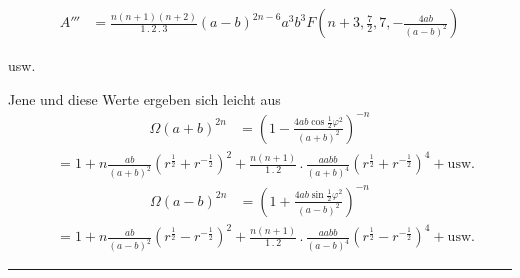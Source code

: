 \[
\begin{array}{rl}
A'''&=\frac{n(n+1)(n+2)}{1\mathbin{.}2\mathbin{.}3}(a-b)^{2n-6}a^3b^3F(n+3,\frac72,7,-\frac{4ab}{(a-b)^2})
\end{array}
\]
\begin{center}usw.\end{center}
Jene und diese Werte ergeben sich leicht aus
\[
\begin{array}{rl}
\Omega(a+b)^{2n}&=(1-\frac{4ab\cos\frac12\varphi^2}{(a+b)^2})^{-n}
\end{array}
\]
\[
\begin{array}{rl}
&=1+n\frac{ab}{(a+b)^2}(r^{\frac12}+r^{-\frac12})^2+\frac{n(n+1)}{1\mathbin{.}2}\mathbin{.}\frac{aabb}{(a+b)^4}(r^{\frac12}+r^{-\frac12})^4+\mathrm{usw.}
\end{array}
\]
\[
\begin{array}{rl}
\Omega(a-b)^{2n}&=(1+\frac{4ab\sin\frac12\varphi^2}{(a-b)^2})^{-n}
\end{array}
\]
\[
\begin{array}{rl}
&=1+n\frac{ab}{(a-b)^2}(r^{\frac12}-r^{-\frac12})^2+\frac{n(n+1)}{1\mathbin{.}2}\mathbin{.}\frac{aabb}{(a-b)^4}(r^{\frac12}-r^{-\frac12})^4+\mathrm{usw.}
\end{array}
\]
\begin{center}\rule{.23\linewidth}{.4pt}\end{center}
